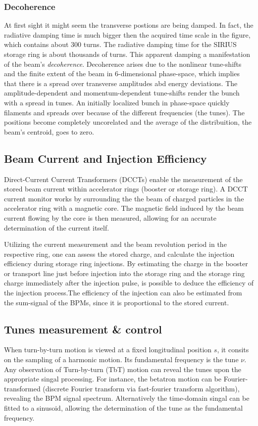 \subsubsection{Decoherence}
At first sight it might seem the transverse postions are being damped. In fact, the radiative damping time is much bigger then the acquired time scale in the figure, which contains about 300 turns. The radiative damping time for the SIRIUS storage ring is about thousands of turns. This apparent damping a manifestation of the beam's \textit{decoherence}.
Decoherence arises due to the nonlinear tune-shifts and the finite extent of the beam in 6-dimensional phase-space, which implies that there is a spread over transverse amplitudes abd energy deviations. The amplitude-dependent and momentum-dependent tune-shifts render the bunch with a spread in tunes. An initially localized bunch in phase-space quickly filaments and spreads over because of the different frequencies (the tunes). The positions become completely uncorelated and the average of the distribuition, the beam's centroid, goes to zero.
\subsection{Beam Current and Injection Efficiency}
Direct-Current Current Transformers (DCCTs) enable the measurement of the stored beam current within accelerator rings (booster or storage ring). A DCCT current monitor works by surrounding the the beam of charged particles in the accelerator ring with a magnetic core. The magnetic field induced by the beam current flowing by the core is then measured, allowing for an accurate determination of the current itself.

 Utilizing the current measurement and the beam revolution period in the respective ring, one can assess the stored charge, and calculate the injection efficiency during storage ring injections. By estimating the charge in the booster or transport line just before injection into the storage ring and the storage ring charge immediately after the injection pulse, is possible to deduce the efficiency of the injection process.The efficiency of the injection can also be estimated from the sum-signal of the BPMs, since it is proportional to the stored current.

\subsection{Tunes measurement \& control}
When turn-by-turn motion is viewed at a fixed longitudinal position $s$, it consits on the sampling of a harmonic motion. Its fundamental frequency is the tune $\nu$. Any observation of Turn-by-turn (TbT) motion can reveal the tunes upon the appropriate singal processing. For instance, the betatron motion can be Fourier-transformed (discrete Fourier transform via fast-fourier transform algorithm), revealing the BPM signal spectrum. Alternatively the time-domain singal can be fitted to a sinusoid, allowing the determination of the tune as the fundamental frequency.


